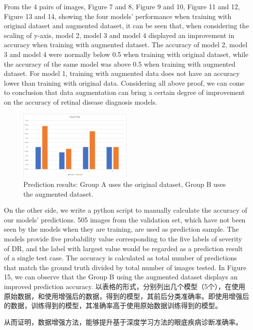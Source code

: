 \documentclass{ijisa}
\begin{document}
From the 4 pairs of images, Figure 7 and 8, Figure 9 and 10, Figure 11 and 12, Figure 13 and 14, showing the four models' performance when training with original dataset and augmented dataset, it can be seen that, when considering the scaling of y-axis, model 2, model 3 and model 4 displayed an improvement in accuracy when training with augmented dataset. The accuracy of model 2, model 3 and model 4 were normally below 0.5 when training with original dataset, while the accuracy of the same model was above 0.5 when training with augmented dataset. For model 1, training with augmented data does not have an accuracy lower than training with original data. Considering all above proof, we can come to conclusion that data augmentation can bring a certain degree of improvement on the accuracy of retinal disease diagnosis models. 

\begin{figure}[h]
\includegraphics[width=0.5\textwidth]{charts/prediction result chart.png}
\caption{Prediction results: Group A uses the original dataset, Group B uses the augmented dataset.}
\end{figure}

On the other side, we write a python script to manually calculate the accuracy of our models' predictions. 505 images from the validation set, which have not been seen by the models when they are training, are used as prediction sample. The models provide five probability value corresponding to the five labels of severity of DR, and the label with largest value would be regarded as a prediction result of a single test case. The accuracy is calculated as total number of predictions that match the ground truth divided by total number of images tested. In Figure 15, we can observe that the Group B using the augmented dataset displays an improved prediction accuracy.
以表格的形式，分别列出几个模型（5个），在使用原始数据，和使用增强后的数据，得到的模型，其前后分类准确率。即使用增强后的数据，训练得到的模型，其准确率高于使用原始数据训练得到的模型。

从而证明，数据增强方法，能够提升基于深度学习方法的眼底疾病诊断准确率。
\end{document}
